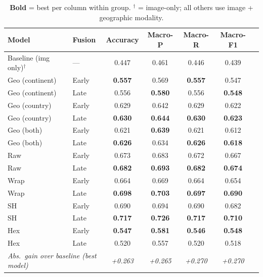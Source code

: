 \begin{table}[htbp]
\centering
\small
\setlength{\tabcolsep}{4pt}
\begin{tabular}{llccccc}
\toprule
\textbf{Model} & \textbf{Fusion} & \textbf{Accuracy} & \textbf{Macro-P} & \textbf{Macro-R} & \textbf{Macro-F1} \\
\midrule
Baseline (img only)$^\dagger$ & — & 0.447 & 0.461 & 0.446 & 0.439 \\
\midrule
Geo (continent) & Early & \textbf{0.557} & 0.569 & \textbf{0.557} & 0.547 \\
Geo (continent) & Late & 0.556 & \textbf{0.580} & 0.556 & \textbf{0.548} \\
\midrule
Geo (country) & Early & 0.629 & 0.642 & 0.629 & 0.622 \\
Geo (country) & Late & \textbf{0.630} & \textbf{0.644} & \textbf{0.630} & \textbf{0.623} \\
\midrule
Geo (both) & Early & 0.621 & \textbf{0.639} & 0.621 & 0.612 \\
Geo (both) & Late & \textbf{0.626} & 0.634 & \textbf{0.626} & \textbf{0.618} \\
\midrule
Raw & Early & 0.673 & 0.683 & 0.672 & 0.667 \\
Raw & Late & \textbf{0.682} & \textbf{0.693} & \textbf{0.682} & \textbf{0.674} \\
\midrule
Wrap & Early & 0.664 & 0.669 & 0.664 & 0.654 \\
Wrap & Late & \textbf{0.698} & \textbf{0.703} & \textbf{0.697} & \textbf{0.690} \\
\midrule
SH & Early & 0.690 & 0.694 & 0.690 & 0.682 \\
SH & Late & \textbf{0.717} & \textbf{0.726} & \textbf{0.717} & \textbf{0.710} \\
\midrule
Hex & Early & \textbf{0.547} & \textbf{0.581} & \textbf{0.546} & \textbf{0.548} \\
Hex & Late & 0.520 & 0.557 & 0.520 & 0.518 \\
\midrule
\multicolumn{2}{l}{\textit{Abs.\ gain over baseline (best model)}} & \textit{+0.263} & \textit{+0.265} & \textit{+0.270} & \textit{+0.270} \\
\bottomrule
\end{tabular}
\caption*{ \textbf{Bold} = best per column within group. $^\dagger$ = image-only; all others use image + geographic modality.}
\label{tab:results}
\end{table}
